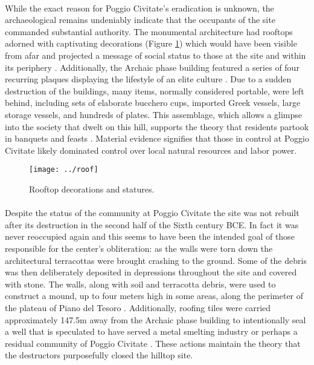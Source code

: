 \documentclass[12pt,a4paper]{thesis}
\begin{document}
\paragraph{}
While the exact reason for Poggio Civitate's eradication is unknown, the archaeological remains undeniably indicate that the occupants of the site commanded substantial authority.  The monumental architecture had rooftops adorned with captivating decorations (Figure \ref{fig:roof}) which would have been visible from afar and projected a message of social status to those at the site and within its periphery \citep{Tuc06,Odo13}. Additionally, the Archaic phase building featured a series of four recurring plaques displaying the lifestyle of an elite culture \cite[159]{Win09}. Due to a sudden destruction of the buildings, many items, normally considered portable, were left behind, including sets of elaborate bucchero cups, imported Greek vessels, large storage vessels, and hundreds of plates. This assemblage, which allows a glimpse into the society that dwelt on this hill, supports the theory that residents partook in banquets and feasts \cite[162-166]{BarRas98}. Material evidence signifies that those in control at Poggio Civitate likely dominated control over local natural resources and labor power. 

\begin{figure}
\centering
\texttt{[image: ../roof]}
\caption{Rooftop decorations and statures.}
\label{fig:roof}
\end{figure}

\paragraph{}
Despite the status of the community at Poggio Civitate the site was not rebuilt after its destruction in the second half of the Sixth century BCE. In fact it was never reoccupied again and this seems to have been the intended goal of those responsible for the center's obliteration: as the walls were torn down the architectural terracottas were brought crashing to the ground. Some of the debris was then deliberately deposited in depressions throughout the site and covered with stone. The walls, along with soil and terracotta debris, were used to construct a mound, up to four meters high in some areas, along the perimeter of the plateau of Piano del Tesoro \citep{IEB94}. Additionally, roofing tiles were carried approximately 147.5m away from the Archaic phase building to intentionally seal a well that is speculated to have served a metal smelting industry or perhaps a residual community of Poggio Civitate \citep{TucBruHunTal10}. These actions maintain the theory that the destructors purposefully closed the hilltop site.
\end{document}

